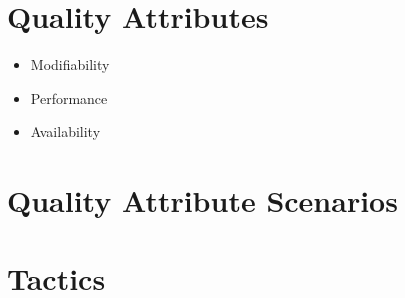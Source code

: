 
\section{Quality Attributes}

\begin{itemize}
    \item Modifiability
    \item Performance
    \item Availability
\end{itemize}

\section{Quality Attribute Scenarios}

\section{Tactics}

